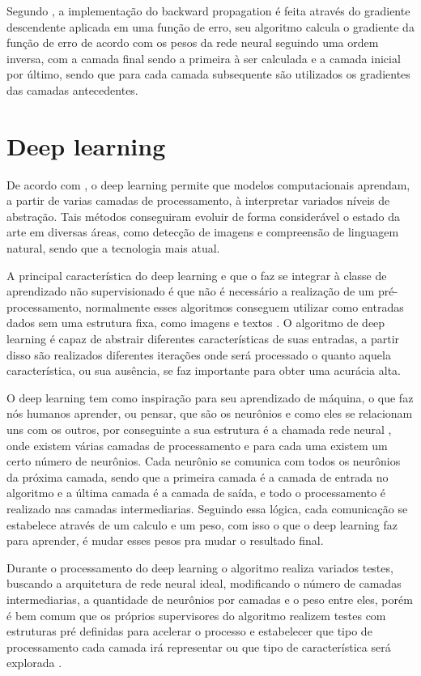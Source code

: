 Segundo , a implementação do backward propagation é feita através do gradiente descendente aplicada em uma função de erro, seu algoritmo calcula o gradiente da função de erro de acordo com os pesos da rede neural seguindo uma ordem inversa, com a camada final sendo a primeira à ser calculada e a camada inicial por último, sendo que para cada camada subsequente são utilizados os gradientes das camadas antecedentes.



\section{Deep learning}

De acordo com , o deep learning permite que modelos computacionais aprendam, a partir de varias camadas de processamento, à interpretar variados níveis de abstração.
Tais métodos conseguiram evoluir de forma considerável o estado da arte em diversas áreas, como detecção de imagens e compreensão de linguagem natural, sendo que a tecnologia mais atual. 

A principal característica  do deep learning e que o faz se integrar à classe de aprendizado não supervisionado é que não é necessário a realização de um pré-processamento, normalmente esses algoritmos conseguem utilizar como entradas dados sem uma estrutura fixa, como imagens e textos \cite{ibm2020}.
O algoritmo de deep learning é capaz de abstrair diferentes características de suas entradas, a partir disso são realizados diferentes iterações onde será processado o quanto aquela característica, ou sua ausência, se faz importante para obter uma acurácia alta.


O deep learning tem como inspiração para seu aprendizado de máquina, o que faz nós humanos aprender, ou pensar, que são os neurônios e como eles se relacionam uns com os outros, por conseguinte a sua estrutura é a chamada rede neural \cite{lecun2015deep}, onde existem várias camadas de processamento e para cada uma existem um certo número de neurônios.
Cada neurônio se comunica com todos os neurônios da próxima camada, sendo que a primeira camada é a camada de entrada no algoritmo e a última camada é a camada de saída, e todo o processamento é realizado nas camadas intermediarias. 
Seguindo essa lógica, cada comunicação se estabelece através de um calculo e um peso, com isso o que o deep learning faz para aprender, é mudar esses pesos pra mudar o resultado final. 

Durante o processamento do deep learning o algoritmo realiza variados testes, buscando a arquitetura de rede neural ideal, modificando o número de camadas intermediarias, a quantidade de neurônios por camadas e o peso entre eles, porém é bem comum que os próprios supervisores do algoritmo realizem testes com estruturas pré definidas para acelerar o processo e estabelecer que tipo de processamento cada camada irá representar ou que tipo de característica será explorada \cite{Bengio2013}.

